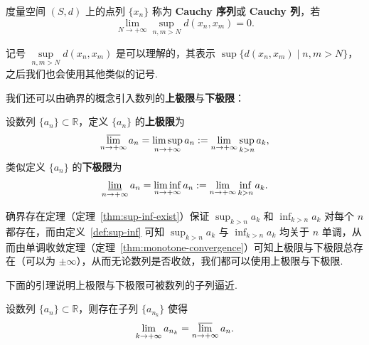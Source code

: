 \documentclass[../main.tex]{subfiles}
\begin{document}
\begin{definition} \label{def:Cauchy-seq-sup}
    度量空间 $(S, d)$ 上的点列 $\{x_n\}$ 称为 \textbf{Cauchy 序列}或 \textbf{Cauchy 列}，若 
    $$
    \lim_{N \to +\infty} \sup_{n, m > N} d(x_n, x_m) = 0. 
    $$
\end{definition}

\begin{remark}
    记号 $\sup\limits_{n, m > N} d(x_n, x_m)$ 是可以理解的，其表示 $\sup \{d(x_n, x_m) \mid n, m > N\}$，之后我们也会使用其他类似的记号. 
\end{remark}

我们还可以由确界的概念引入数列的\textbf{上极限}与\textbf{下极限}：

\begin{definition}[数列的上极限与下极限的定义] \label{def:limsup-liminf}
    设数列 $\{a_n\} \subset \mathbb R$，定义 $\{a_n\}$ 的\textbf{上极限}为
    $$
    \varlimsup_{n \to +\infty} a_n = \limsup_{n \to +\infty} a_n := \lim_{n \to +\infty} \sup_{k > n} a_k, 
    $$
    类似定义 $\{a_n\}$ 的\textbf{下极限}为
    $$
    \varliminf_{n \to +\infty} a_n = \liminf_{n \to +\infty} a_n := \lim_{n \to +\infty} \inf_{k > n} a_k. 
    $$
\end{definition}

\begin{remark}
    确界存在定理（定理~\ref{thm:sup-inf-exist}）保证 $\sup_{k > n} a_k$ 和 $\inf_{k > n} a_k$ 对每个 $n$ 都存在，而由定义~\ref{def:sup-inf} 可知 $\sup_{k > n} a_k$ 与 $\inf_{k > n} a_k$ 均关于 $n$ 单调，从而由单调收敛定理（定理~\ref{thm:monotone-convergence}）可知上极限与下极限总存在（可以为 $\pm \infty$），从而无论数列是否收敛，我们都可以使用上极限与下极限. 
\end{remark}

下面的引理说明上极限与下极限可被数列的子列逼近. 

\begin{lemma} \label{lem:limsup-liminf-subseq}
    设数列 $\{a_n\} \subset \mathbb R$，则存在子列 $\{a_{n_k}\}$ 使得 
    $$
    \lim\limits_{k \to +\infty} a_{n_k} = \varlimsup\limits_{n \to +\infty} a_n. 
    $$
\end{lemma}
\end{document}
